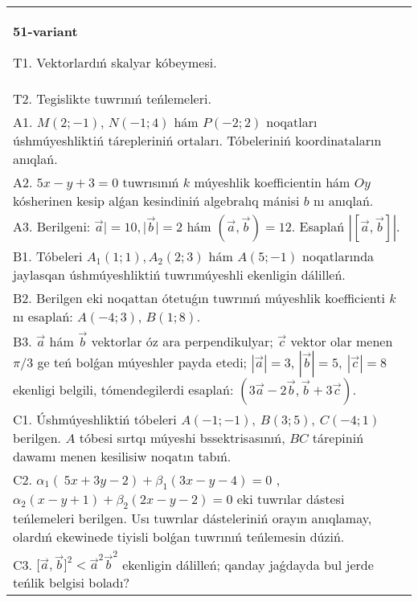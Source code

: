 \documentclass{article}
\begin{document}
\begin{tabular}{m{17cm}}
    \textbf{51-variant}
    \newline
    
    T1. 
    Vektorlardıń skalyar kóbeymesi.
     \\
    T2. 
    Tegislikte tuwrınıń teńlemeleri.
     \\
    A1. 
    $M(2;-1)$, $N(-1;4)$ hám $P(-2;2)$ noqatları
    úshmúyeshliktiń tárepleriniń ortaları. Tóbeleriniń koordinataların
    anıqlań.
     \\
    A2. 
    $5x-y+3=0$ tuwrısınıń $k$ múyeshlik
    koefficientin hám $Oy$ kósherinen kesip alǵan kesindiniń algebralıq
    mánisi $b$ nı anıqlań.
     \\
    A3. 
    Berilgeni: $\overrightarrow{a}| = 10,|\overrightarrow{b}| = 2$ hám
    $\left(\overrightarrow{a},\overrightarrow{b} \right) = 12$. Esaplań
    $\left| \left\lbrack \overrightarrow{a},\overrightarrow{b} \right\rbrack \right|$.
     \\
    B1. 
    Tóbeleri $A_1(1; 1), A_2(2; 3)$ hám $A(5;-1)$
    noqatlarında jaylasqan úshmúyeshliktiń tuwrımúyeshli ekenligin dálilleń.
     \\
    B2. 
    Berilgen eki noqattan ótetuǵın tuwrınıń múyeshlik
    koefficienti $k$ nı esaplań: $A(-4;3)$, $B(1;8)$.
     \\
    B3. 
    $\vec{a}$ hám $\vec{b}$ vektorlar óz ara perpendikulyar; $\vec{c}$ vektor olar menen $\pi/3$ ge teń bolǵan múyeshler payda etedi; $|\vec{a}| = 3$, $|\vec{b}| = 5,\ |\vec{c}| = 8$ ekenligi belgili, tómendegilerdi esaplań: 
    $\left(3\vec{a} - 2\vec{b},\vec{b} + 3\vec{c} \right)$.
     \\
    C1. 
    Úshmúyeshliktiń tóbeleri
    \(A( - 1; - 1),\ B(3;5),\ C( - 4;1)\) berilgen. $A$ tóbesi sırtqı
    múyeshi bssektrisasınıń, $BC$ tárepiniń dawamı menen kesilisiw
    noqatın tabıń.
     \\
    C2. 
    \(\alpha_{1}(\ 5x + 3y - 2) + \beta_{1}(3x - y - 4) = 0\) ,
    \(\alpha_{2}(x - y + 1) + \beta_{2}(2x - y - 2) = 0\) eki tuwrılar
    dástesi teńlemeleri berilgen. Usı tuwrılar dásteleriniń orayın
    anıqlamay, olardıń ekewinede tiyisli bolǵan tuwrınıń teńlemesin dúziń.
     \\
    C3. 
    \(\lbrack\vec{a},\vec{b}\rbrack^{2} <  {\vec{a}}^{2}{\vec{b}}^{2}\) ekenligin dálilleń; qanday jaǵdayda bul jerde teńlik belgisi boladı?
     \\
    
    \end{tabular}
    \vspace{1cm}
    
\end{document}
